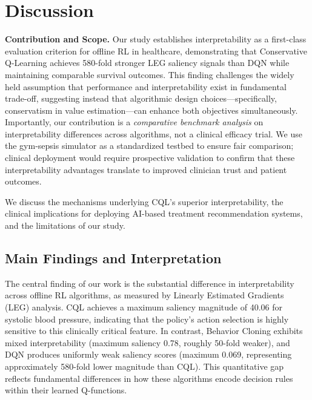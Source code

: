 
\section{Discussion}\label{sec:discussion}

\textbf{Contribution and Scope.} Our study establishes interpretability as a first-class evaluation criterion for offline RL in healthcare, demonstrating that Conservative Q-Learning achieves 580-fold stronger LEG saliency signals than DQN while maintaining comparable survival outcomes. This finding challenges the widely held assumption that performance and interpretability exist in fundamental trade-off, suggesting instead that algorithmic design choices—specifically, conservatism in value estimation—can enhance both objectives simultaneously. Importantly, our contribution is a \textit{comparative benchmark analysis} on interpretability differences across algorithms, not a clinical efficacy trial. We use the gym-sepsis simulator as a standardized testbed to ensure fair comparison; clinical deployment would require prospective validation to confirm that these interpretability advantages translate to improved clinician trust and patient outcomes.

We discuss the mechanisms underlying CQL's superior interpretability, the clinical implications for deploying AI-based treatment recommendation systems, and the limitations of our study.

\subsection{Main Findings and Interpretation}\label{sec:discussion:findings}

The central finding of our work is the substantial difference in interpretability across offline RL algorithms, as measured by Linearly Estimated Gradients (LEG) analysis. CQL achieves a maximum saliency magnitude of 40.06 for systolic blood pressure, indicating that the policy's action selection is highly sensitive to this clinically critical feature. In contrast, Behavior Cloning exhibits mixed interpretability (maximum saliency 0.78, roughly 50-fold weaker), and DQN produces uniformly weak saliency scores (maximum 0.069, representing approximately 580-fold lower magnitude than CQL). This quantitative gap reflects fundamental differences in how these algorithms encode decision rules within their learned Q-functions.

